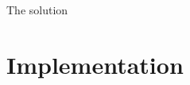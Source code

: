 \documentclass{beamer}
\begin{document}
\begin{frame}{The solution}
\begin{center}
\noindent{}
\end{center}
\end{frame}
\section{Implementation}
\end{document}
